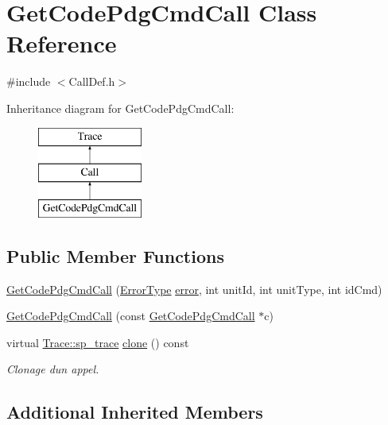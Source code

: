 \hypertarget{class_get_code_pdg_cmd_call}{}\section{Get\+Code\+Pdg\+Cmd\+Call Class Reference}
\label{class_get_code_pdg_cmd_call}


{\ttfamily \#include $<$Call\+Def.\+h$>$}

Inheritance diagram for Get\+Code\+Pdg\+Cmd\+Call\+:\begin{figure}[H]
\begin{center}
\leavevmode
\includegraphics[height=3.000000cm]{class_get_code_pdg_cmd_call}
\end{center}
\end{figure}
\subsection*{Public Member Functions}
\begin{DoxyCompactItemize}
\item 
\hyperlink{class_get_code_pdg_cmd_call_a43634e43855c48ccf4389f5a30634ebc}{Get\+Code\+Pdg\+Cmd\+Call} (\hyperlink{class_call_ade833a08ce215aaa4121102f3448c898}{Error\+Type} \hyperlink{class_call_a206f6150a8038fda48c17c2c7421aed1}{error}, int unit\+Id, int unit\+Type, int id\+Cmd)
\item 
\hyperlink{class_get_code_pdg_cmd_call_adbbbc84d8b72f97363ffdfeb45e6b5ce}{Get\+Code\+Pdg\+Cmd\+Call} (const \hyperlink{class_get_code_pdg_cmd_call}{Get\+Code\+Pdg\+Cmd\+Call} $\ast$c)
\item 
virtual \hyperlink{class_trace_a9c58e523529fc8a03fb6acf3eef86150}{Trace\+::sp\+\_\+trace} \hyperlink{class_get_code_pdg_cmd_call_adad7b71e06c9b81d17b02191401245f5}{clone} () const 
\begin{DoxyCompactList}\small\item\em Clonage d\textquotesingle{}un appel. \end{DoxyCompactList}\end{DoxyCompactItemize}
\subsection*{Additional Inherited Members}


